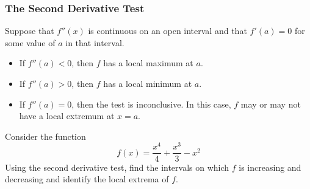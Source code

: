\documentclass[10pt,t,handout,ignorenonframetext,aspectratio=169]{beamer}
\begin{document}
\begin{frame}
  \frametitle{The Second Derivative Test}
  \begin{thm}
    Suppose that $f''(x)$ is continuous on an open interval and that
    $f'(a)=0$ for some value of $a$ in that interval.
    \begin{itemize}
    \item If $f''(a) <0$, then $f$ has a local maximum at $a$.
    \item If $f''(a) >0$, then $f$ has a local minimum at $a$.
    \item If $f''(a) =0$, then the test is inconclusive. In this case,
      $f$ may or may not have a local extremum at $x=a$.
    \end{itemize}
  \end{thm}
\end{frame}

\begin{frame}
  \vs
  \begin{question}
    Consider the function
    \[
      f(x) = \frac{x^4}{4}+\frac{x^3}{3}-x^2
    \]
    Using the second derivative test, find the intervals on which $f$ is increasing and decreasing and
    identify the local extrema of $f$.
  \end{question}
\end{frame}
\end{document}
